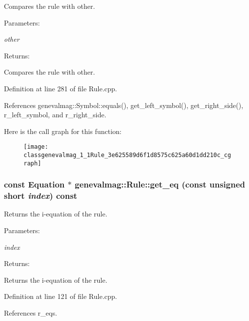 Compares the rule with other. \begin{Desc}
\item[Parameters:]
\begin{description}
\item[{\em other}]\end{description}
\end{Desc}
\begin{Desc}
\item[Returns:]\end{Desc}
Compares the rule with other. 

Definition at line 281 of file Rule.cpp.

References genevalmag::Symbol::equals(), get\_\-left\_\-symbol(), get\_\-right\_\-side(), r\_\-left\_\-symbol, and r\_\-right\_\-side.

Here is the call graph for this function:\nopagebreak
\begin{figure}[H]
\begin{center}
\leavevmode
\texttt{[image: classgenevalmag\_1\_1Rule\_3e625589d6f1d8575c625a60d1dd210c\_cgraph]}
\end{center}
\end{figure}
\hypertarget{classgenevalmag_1_1Rule_f7912b2d239ede0e33ed6cb12b2d79ee}{
\subsubsection[{get\_\-eq}]{\setlength{\rightskip}{0pt plus 5cm}const {\bf Equation} $\ast$ genevalmag::Rule::get\_\-eq (const unsigned short {\em index}) const}}
\label{classgenevalmag_1_1Rule_f7912b2d239ede0e33ed6cb12b2d79ee}


Returns the i-equation of the rule. \begin{Desc}
\item[Parameters:]
\begin{description}
\item[{\em index}]\end{description}
\end{Desc}
\begin{Desc}
\item[Returns:]\end{Desc}
Returns the i-equation of the rule. 

Definition at line 121 of file Rule.cpp.

References r\_\-eqs.

